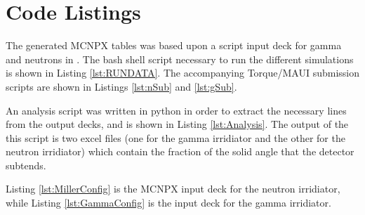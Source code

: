 \documentclass[draftcls,onecolumn]{IEEEtran}
\begin{document}
\section{Code Listings}
The generated MCNPX tables was based upon a script input deck for gamma and neutrons in .
The bash shell script necessary to run the different simulations is shown in Listing \ref{lst:RUNDATA}. 
The accompanying Torque/MAUI submission scripts are shown in Listings \ref{lst:nSub} and \ref{lst:gSub}.



An analysis script was written in python in order to extract the necessary lines from the output decks, and is shown in Listing \ref{lst:Analysis}.
The output of the this script is two excel files (one for the gamma irridiator and the other for the neutron irridiator) which contain the fraction of the solid angle that the detector subtends.


Listing \ref{lst:MillerConfig} is the MCNPX input deck for the neutron irridiator, while Listing \ref{lst:GammaConfig} is the input deck for the gamma irridiator.


\end{document}
